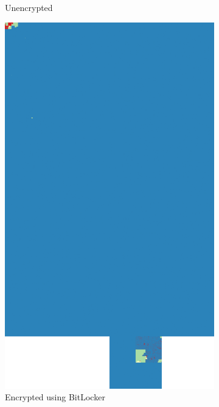 \documentclass[
  digital, %
  color,   %
  oneside, %
  lof,     %
  nolot,     %
]{fithesis4}
\begin{document}
\begin{figure}
\begin{subfigure}[t]{.45\textwidth}
    \caption{Unencrypted}
    \label{fig:bitlocker-unenc}
  \end{subfigure}
  \hfill
  \begin{subfigure}[t]{.45\textwidth}
    \centering
    \includegraphics[width=\textwidth,interpolate=false]{win-encrypted-chi2-4.png}
    \caption{Encrypted using BitLocker}
    \label{fig:bitlocker-enc}
  \end{subfigure}
  \begin{subfigure}[t]{0.45\textwidth}
    \centering

\end{subfigure}
\end{figure}
\end{document}
